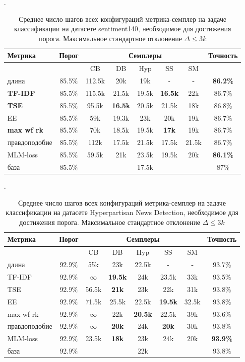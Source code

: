 \documentclass{spbau-diploma}
\begin{document}
\begin{table}[h]
	\caption{Среднее число шагов всех конфигураций метрика-семплер на задаче классификации на датасете sentiment140, необходимое для достижения порога. Максимальное стандартное отклонение $\Delta \le 3k$}.
	\label{table:s140_fine_tuning}
	\centering
	\begin{tabular}{|l|c|ccccc|c|}
		\hline
		Метрика & Порог & & \multicolumn{3}{c}{Семплеры} & & Точность\\
		\hline
		& & CB & DB & Hyp & SS & SM &\\
		\hline
		длина & 85.5\% & 112.5k & 20k & 19k & - & - & {\bf 86.2\%} \\
		{\bf TF-IDF} & 85.5\% & 115.5k & 21.5k & 19.5k & {\bf 16.5k} & 22k & 86.7\% \\
		{\bf TSE} & 85.5\% & 95.5k & {\bf 16.5k} & 20.5k & 21.5k & 18k & 86.8\% \\
		EE & 85.5\% & 59k & 19.3k & 23k & 20k & 19k & 86.7\% \\
		{\bf max wf rk} & 85.5\% & 70k & 18.5k & 19.5k & {\bf 17k} & 19k & 86.7\% \\
		правдоподобие & 85.5\% & 112k & 17.5k & 21.5k & 17.5k & 21.5k & 86.7\% \\
		MLM-loss & 85.5\% & 59.5k & 21k & 23.5k & 19.5k & 20k & {\bf 86.1\%} \\
		\hline
		база & 85.5\% & & \multicolumn{3}{c}{17.5k} & & 87\% \\
		\hline
	\end{tabular}
\end{table}

\begin{table}[h]
	\caption{Среднее число шагов всех конфигураций метрика-семплер на задаче классификации на датасете Hyperpartisan News Detection, необходимое для достижения порога. Максимальное стандартное отклонение $\Delta \le 3k$}.
	\label{table:hnd_fine_tuning}
	\centering
	\begin{tabular}{|l|c|ccccc|c|}
		\hline
		Метрика & Порог & & \multicolumn{3}{c}{Семплеры} & & Точность\\
		\hline
		& & CB & DB & Hyp & SS & SM & \\
		\hline
		длина & 92.9\% & 55k & 23k & 22.5k & - & - & 93.7\% \\
		TF-IDF & 92.9\%  & $\infty$ & {\bf 19.5k} & 24k & 23.5k & 33k & 93.5\% \\
		TSE & 92.9\% & 56.5k & {\bf 21k} & 23k & 22k & 31k & 93.8\% \\
		EE & 92.9\%  & 71.5k & 25.5k & 22.5k & {\bf 19.5k} & 32.5k & 93.8\% \\
		max wf rk & 92.9\%  & $\infty$ & 22k & {\bf 20.5k} & 22.5k & 39k & 93.6\% \\
		правдоподобие & 92.9\% & $\infty$ & {\bf 20k} & 24k & {\bf 20k} & 30k & 93.8\% \\
		MLM-loss & 92.9\% & 23.5k & {\bf 18k} & 23k & 24k & 20k & {\bf 93.9\%} \\
		\hline
		база & 92.9\%  & \multicolumn{5}{c}{22k} & 93.8\% \\
		\hline
	\end{tabular}
\end{table}
\end{document}
